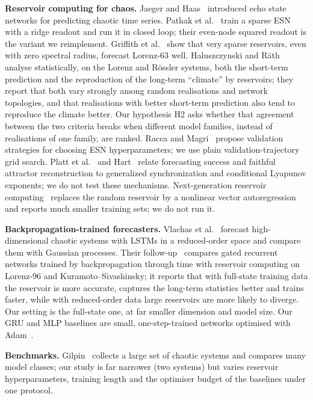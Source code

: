 \textbf{Reservoir computing for chaos.} Jaeger and Haas~\cite{jaeger2004harnessing} introduced echo state networks for predicting chaotic time series. Pathak et al.~\cite{pathak2017using} train a sparse ESN with a ridge readout and run it in closed loop; their even-node squared readout is the variant we reimplement. Griffith et al.~\cite{griffith2019forecasting} show that very sparse reservoirs, even with zero spectral radius, forecast Lorenz-63 well. Haluszczynski and R\"ath~\cite{haluszczynski2019good} analyse statistically, on the Lorenz and R\"ossler systems, both the short-term prediction and the reproduction of the long-term ``climate'' by reservoirs; they report that both vary strongly among random realisations and network topologies, and that realisations with better short-term prediction also tend to reproduce the climate better. Our hypothesis H2 asks whether that agreement between the two criteria breaks when different model families, instead of realisations of one family, are ranked. Racca and Magri~\cite{racca2021robust} propose validation strategies for choosing ESN hyperparameters; we use plain validation-trajectory grid search. Platt et al.~\cite{platt2021forecasting} and Hart~\cite{hart2023attractor} relate forecasting success and faithful attractor reconstruction to generalized synchronization and conditional Lyapunov exponents; we do not test these mechanisms. Next-generation reservoir computing~\cite{gauthier2021next} replaces the random reservoir by a nonlinear vector autoregression and reports much smaller training sets; we do not run it.

\textbf{Backpropagation-trained forecasters.} Vlachas et al.~\cite{vlachas2018data} forecast high-dimensional chaotic systems with LSTMs in a reduced-order space and compare them with Gaussian processes. Their follow-up~\cite{vlachas2020backpropagation} compares gated recurrent networks trained by backpropagation through time with reservoir computing on Lorenz-96 and Kuramoto--Sivashinsky; it reports that with full-state training data the reservoir is more accurate, captures the long-term statistics better and trains faster, while with reduced-order data large reservoirs are more likely to diverge. Our setting is the full-state one, at far smaller dimension and model size. Our GRU and MLP baselines are small, one-step-trained networks optimised with Adam~\cite{kingma2014adam}.

\textbf{Benchmarks.} Gilpin~\cite{gilpin2021chaos,gilpin2023model} collects a large set of chaotic systems and compares many model classes; our study is far narrower (two systems) but varies reservoir hyperparameters, training length and the optimiser budget of the baselines under one protocol.
